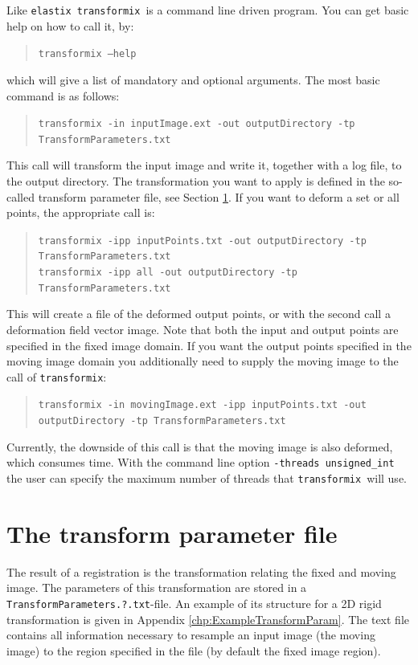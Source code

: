 \documentclass[]{report}
\newcommand{\elastix}{\texttt{elastix}}
\newcommand{\transformix}{\texttt{transformix}}
\begin{document}
Like \elastix\, \transformix\ is a command line driven program. You
can get basic help on how to call it, by:
\begin{quote}
\texttt{transformix --help}
\end{quote}
which will give a list of mandatory and optional arguments. The most
basic command is as follows:
\begin{quote}
\texttt{transformix -in inputImage.ext -out outputDirectory -tp
TransformParameters.txt}
\end{quote}
This call will transform the input image and write it, together with
a log file, to the output directory. The transformation you want to
apply is defined in the so-called transform parameter file, see
Section \ref{sec:transformix:tp}. If you want to deform a set or all
points, the appropriate call is:
\begin{quote}
\texttt{transformix -ipp inputPoints.txt -out outputDirectory -tp
TransformParameters.txt} \\
\texttt{transformix -ipp all -out outputDirectory -tp
TransformParameters.txt}
\end{quote}
This will create a file of the deformed output points, or with the
second call a deformation field vector image. Note that both the
input and output points are specified in the fixed image domain. If
you want the output points specified in the moving image domain you
additionally need to supply the moving image to the call of
\transformix:
\begin{quote}
\texttt{transformix -in movingImage.ext -ipp inputPoints.txt -out
outputDirectory -tp TransformParameters.txt}
\end{quote}
Currently, the downside of this call is that the moving image is also
deformed, which consumes time. With the command line option
\texttt{-threads unsigned\_int} the user can specify the maximum
number of threads that \transformix\ will use.

\section{The transform parameter file}\label{sec:transformix:tp}

The result of a registration is the transformation relating the fixed
and moving image. The parameters of this transformation are stored in
a \texttt{TransformParameters.?.txt}-file. An example of its
structure for a 2D rigid transformation is given in Appendix
\ref{chp:ExampleTransformParam}. The text file contains all
information necessary to resample an input image (the moving image)
to the region specified in the file (by default the fixed image
region).
\end{document}
